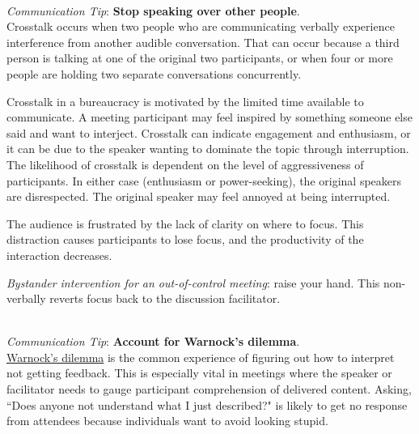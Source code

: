\ \\
\textit{Communication Tip}: \textbf{Stop speaking over other people\label{sec:crosstalk}}.\\
Crosstalk occurs when two people who are communicating verbally experience interference from another audible conversation. That can occur because a third person is talking at one of the original two participants, or when four or more people are holding two separate conversations concurrently. 

Crosstalk in a bureaucracy is motivated by the 
limited time available to communicate. A meeting participant may feel inspired by something someone else said and want to interject. 
Crosstalk can indicate engagement and enthusiasm, or it can be due to the speaker wanting to dominate the topic through interruption. The likelihood of crosstalk is dependent on the level of aggressiveness of participants.
In either case (enthusiasm or power-seeking), the original speakers are disrespected. The original speaker may feel annoyed at being interrupted.



The audience is frustrated by the lack of clarity on where to focus. This distraction causes participants to lose  focus, and the productivity of the interaction decreases.

\textit{Bystander intervention for an out-of-control meeting}: raise your hand. 
This non-verbally reverts focus back to the discussion facilitator. 

\ \\
\textit{Communication Tip}: \textbf{Account for Warnock's dilemma}.\\
\href{https://en.wikipedia.org/wiki/Warnock\%27s_dilemma}{Warnock's dilemma}
is the common experience of figuring out how to interpret not getting feedback. This is especially vital in meetings where the speaker or facilitator needs to gauge participant comprehension of delivered content. Asking, ``Does anyone not understand what I just described?" is likely to get no response from attendees because individuals want to avoid looking stupid.


